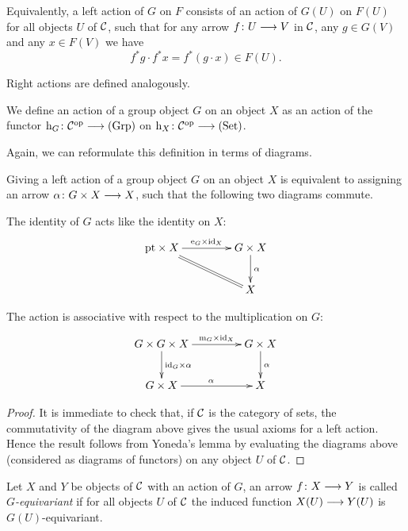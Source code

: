 \begin{2   CONTRAVARIANT FUNCTORS}
\begin{2.2 Group objects}
Equivalently, a left action of $G$ on $F$ consists of an action of $G(U)$ on $F(U)$ for all objects $U$ of $\mathcal{C}$, such that for any arrow $f \colon U \arr V$ in $\mathcal{C}$, any $g \in G(V)$ and any $x \in F(V)$ we have
   \[
   f^*g \cdot f^*x = f^*(g \cdot x) \in F(U).
   \]

Right actions are defined analogously.

We define an action of a group object $G$ on an object $X$ as an action of the functor $\h_G \colon \cC\op \arr \catgrp$ on $\h_X \colon \cC\op \arr \catset$.

Again, we can reformulate this definition in terms of diagrams.

\begin{proposition}\label{prop:diagram-action}
Giving a left action of a group object $G$ on an object $X$ is equivalent to assigning an arrow $\alpha \colon G \times X \arr X$, such that the following two diagrams commute.

\begin{enumeratei}

\item The identity of $G$ acts like the identity on $X$:
   \[
   \xymatrix@C+20pt{
   {}\pt \times X\ar@{=}[rd]\ar[r]^-{\iden_G \times \id_X}&
   G\times X\ar[d]^{\alpha}\\
   &X
   }
   \]

\item The action is associative with respect to the multiplication
on $G$:
   \[
   \xymatrix@C+20pt{
   G \times G \times X
			\ar[r]^-{\mul_G \times\id_X}\ar[d]^{\id_G \times\alpha}&
   G \times X\ar[d]^{\alpha}\\
   G \times X\ar[r]^{\alpha}&
   X
   }
   \]

\end{enumeratei}
\end{proposition}

\begin{proof}
It is immediate to check that, if $\mathcal{C}$ is the category of sets, the commutativity of the diagram above gives the usual axioms for a left action. Hence the result follows from Yoneda's lemma by evaluating the diagrams above (considered as diagrams of functors) on any object $U$ of $\mathcal{C}$.
\end{proof}


\begin{definition}
Let $X$ and $Y$ be objects of $\mathcal{C}$ with an action of $G$, an arrow $f \colon X \arr Y$ is called \emph{$G$-equivariant} if for all objects $U$ of $\mathcal{C}$ the  induced function $X(U) \arr Y(U)$ is $G(U)$-equivariant.
\end{definition}


\end{2.2 Group objects}
\end{2   CONTRAVARIANT FUNCTORS}
